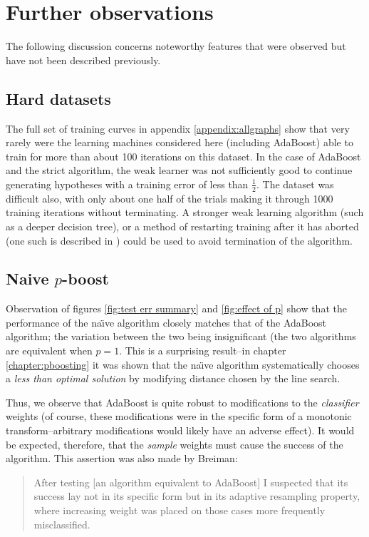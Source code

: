 \section{Further observations}

The following discussion concerns noteworthy features that were
observed but have not been described previously.

\subsection{Hard datasets}

The full set of training curves in appendix \ref{appendix:allgraphs}
show that very rarely were the learning machines considered here
(including AdaBoost) able to train for more than about 100 iterations
on this dataset.  In the case of AdaBoost and the strict algorithm,
the weak learner was not sufficiently good to continue generating
hypotheses with a training error of less than $\frac{1}{2}$.  The
 dataset was difficult also, with only about one half of the
trials making it through 1000 training iterations without
terminating.  A stronger weak learning algorithm (such as a deeper
decision tree), or a method of restarting training after it has
aborted (one such is described in \cite{Bauer99}) could be used to
avoid termination of the algorithm.

\subsection{Naive $p$-boost}

Observation of figures \ref{fig:test err summary} and \ref{fig:effect
of p} show that the performance of the na\"{\i}ve algorithm closely
matches that of the AdaBoost algorithm; the variation between the two
being insignificant (the two algorithms are equivalent when $p = 1$.
This is a surprising result--in chapter \ref{chapter:pboosting} it was
shown that the na\"{\i}ve algorithm systematically chooses a
\emph{less than optimal solution} by modifying distance chosen by the
line search.

Thus, we observe that AdaBoost is quite robust to modifications to the
\emph{classifier} weights (of course, these modifications were in the
specific form of a monotonic transform--arbitrary modifications would
likely have an adverse effect).  It would be expected, therefore, that
the \emph{sample} weights must cause the success of the algorithm.
This assertion was also made by Breiman:

\begin{quotation}
After testing [an algorithm equivalent to AdaBoost] I suspected that
its success lay not in its specific form but in its adaptive
resampling property, where increasing weight was placed on those cases
more frequently misclassified.  \cite{Breiman96}
\end{quotation}

